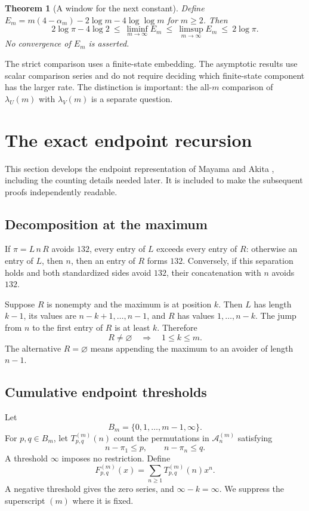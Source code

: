 \documentclass[11pt,a4paper]{article}
\newtheorem{theorem}{Theorem}[section]
\theoremstyle{definition}\newaliascnt{definition}{theorem}
\theoremstyle{remark}\newaliascnt{remark}{theorem}
\newcommand{\Aclass}{\mathcal A}
\begin{document}
\begin{theorem}[A window for the next constant]\label{thm:window-main}
Define $E_m=m(4-\alpha_m)-2\log m-4\log\log m$ for $m\ge2$. Then
\begin{equation}
 2\log\pi-4\log2
 \ \le\ \liminf_{m\to\infty}E_m
 \ \le\ \limsup_{m\to\infty}E_m
 \ \le\ 2\log\pi.
 \label{eq:constant-window}
\end{equation}
No convergence of $E_m$ is asserted.
\end{theorem}

The strict comparison uses a finite-state embedding. The asymptotic results
use scalar comparison series and do not require deciding which finite-state
component has the larger rate. The distinction is important: the all-$m$
comparison of $\lambda_U(m)$ with $\lambda_V(m)$ is a separate question.

\section{The exact endpoint recursion}
\label{sec:endpoints}
This section develops the endpoint representation of Mayama and Akita
\cite[Section~2]{MayamaAkita}, including the counting details needed later.
It is included to make the subsequent proofs independently readable.

\subsection{Decomposition at the maximum}
If $\pi=L\,n\,R$ avoids $132$, every entry of $L$ exceeds every entry of $R$:
otherwise an entry of $L$, then $n$, then an entry of $R$ forms $132$.
Conversely, if this separation holds and both standardized sides avoid
$132$, their concatenation with $n$ avoids $132$.

Suppose $R$ is nonempty and the maximum is at position $k$. Then $L$ has
length $k-1$, its values are $n-k+1,\ldots,n-1$, and $R$ has values
$1,\ldots,n-k$. The jump from $n$ to the first entry of $R$ is at least $k$.
Therefore
\begin{equation}
 R\ne\varnothing\quad\Longrightarrow\quad 1\le k\le m.
 \label{eq:max-position}
\end{equation}
The alternative $R=\varnothing$ means appending the maximum to an avoider
of length $n-1$.

\subsection{Cumulative endpoint thresholds}
Let
\[
 B_m=\{0,1,\ldots,m-1,\infty\}.
\]
For $p,q\in B_m$, let $T_{p,q}^{(m)}(n)$ count the permutations in
$\Aclass_n^{(m)}$ satisfying
\[
 n-\pi_1\le p,\qquad n-\pi_n\le q.
\]
A threshold $\infty$ imposes no restriction. Define
\[
 F_{p,q}^{(m)}(x)=\sum_{n\ge1}T_{p,q}^{(m)}(n)x^n.
\]
A negative threshold gives the zero series, and $\infty-k=\infty$.
We suppress the superscript $(m)$ where it is fixed.
\end{document}

